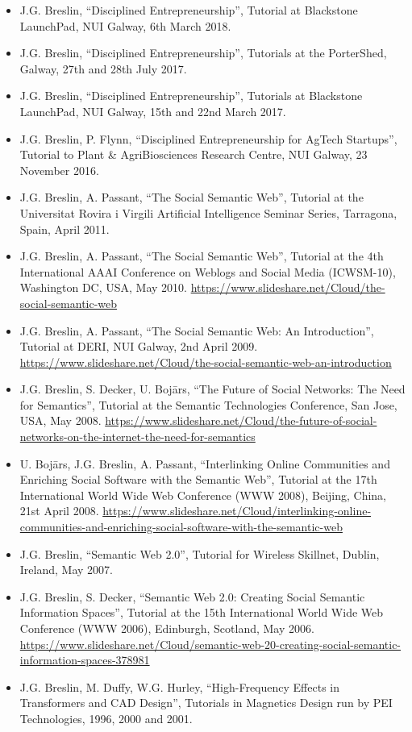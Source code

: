 \documentclass[10pt,a4paper]{res} %
\begin{document}
\begin{resume}
\begin{itemize} \itemsep -2pt
\item J.G. Breslin, ``Disciplined Entrepreneurship'', Tutorial at Blackstone LaunchPad, NUI Galway, 6th March 2018. %
\item J.G. Breslin, ``Disciplined Entrepreneurship'', Tutorials at the PorterShed, Galway, 27th and 28th July 2017. %
\item J.G. Breslin, ``Disciplined Entrepreneurship'', Tutorials at Blackstone LaunchPad, NUI Galway, 15th and 22nd March 2017. %
\item J.G. Breslin, P. Flynn, ``Disciplined Entrepreneurship for AgTech Startups'', Tutorial to Plant \& AgriBiosciences Research Centre, NUI Galway, 23 November 2016. %
\item J.G. Breslin, A. Passant, ``The Social Semantic Web'', Tutorial at the Universitat Rovira i Virgili Artificial Intelligence Seminar Series, Tarragona, Spain, April 2011. %
\item J.G. Breslin, A. Passant, ``The Social Semantic Web'', Tutorial at the 4th International AAAI Conference on Weblogs and Social Media (ICWSM-10), Washington DC, USA, May 2010. \url{https://www.slideshare.net/Cloud/the-social-semantic-web}
\item J.G. Breslin, A. Passant, ``The Social Semantic Web: An Introduction'', Tutorial at DERI, NUI Galway, 2nd April 2009. \url{https://www.slideshare.net/Cloud/the-social-semantic-web-an-introduction}
\item J.G. Breslin, S. Decker, U. Boj\={a}rs, ``The Future of Social Networks: The Need for Semantics'', Tutorial at the Semantic Technologies Conference, San Jose, USA, May 2008. \url{https://www.slideshare.net/Cloud/the-future-of-social-networks-on-the-internet-the-need-for-semantics}
\item U. Boj\={a}rs, J.G. Breslin, A. Passant, ``Interlinking Online Communities and Enriching Social Software with the Semantic Web'', Tutorial at the 17th International World Wide Web Conference (WWW 2008), Beijing, China, 21st April 2008. \url{https://www.slideshare.net/Cloud/interlinking-online-communities-and-enriching-social-software-with-the-semantic-web}
\item J.G. Breslin, ``Semantic Web 2.0'', Tutorial for Wireless Skillnet, Dublin, Ireland, May 2007. %
\item J.G. Breslin, S. Decker, ``Semantic Web 2.0: Creating Social Semantic Information Spaces'', Tutorial at the 15th International World Wide Web Conference (WWW 2006), Edinburgh, Scotland, May 2006. \url{https://www.slideshare.net/Cloud/semantic-web-20-creating-social-semantic-information-spaces-378981}
\item J.G. Breslin, M. Duffy, W.G. Hurley, ``High-Frequency Effects in Transformers and CAD Design'', Tutorials in Magnetics Design run by PEI Technologies, 1996, 2000 and 2001. %
\end{itemize}


\end{resume}
\end{document}
